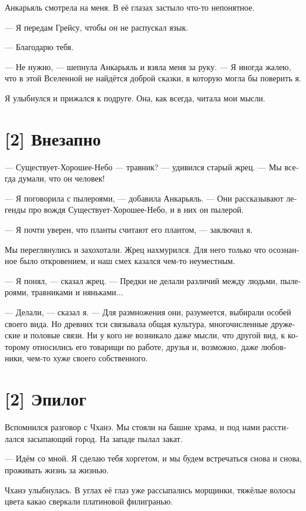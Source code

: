 \documentclass[a4paper,12pt,fleqn]{book}\usepackage{polyglossia}\setdefaultlanguage[babelshorthands=true]{russian}\setotherlanguage{english}\defaultfontfeatures{Ligatures=TeX,Mapping=tex-text}\usepackage{xcolor}\newcommand{\ml}[3]{#2}
\begin{document}
{Анкарьяль смотрела на меня.
В её глазах застыло что-то непонятное.

--- Я передам Грейсу, чтобы он не распускал язык.

--- Благодарю тебя.

--- Не нужно, --- шепнула Анкарьяль и взяла меня за руку.
--- Я иногда жалею, что в этой Вселенной не найдётся доброй сказки, в которую могла бы поверить я.

Я улыбнулся и прижался к подруге.
Она, как всегда, читала мои мысли.

\section{[2] Внезапно}

--- Существует-Хорошее-Небо — травник? --- удивился старый жрец.
--- Мы всегда думали, что он человек!

--- Я поговорила с пылероями, --- добавила Анкарьяль.
--- Они рассказывают легенды про вождя Существует-Хорошее-Небо, и в них он пылерой.

--- Я почти уверен, что планты считают его плантом, --- заключил я.

Мы переглянулись и захохотали.
Жрец нахмурился.
Для него только что осознанное было откровением, и наш смех казался чем-то неуместным.

--- Я понял, --- сказал жрец.
--- Предки не делали различий между людьми, пылероями, травниками и няньками...

--- Делали, --- сказал я.
--- Для размножения они, разумеется, выбирали особей своего вида.
Но древних тси связывала общая культура, многочисленные дружеские и половые связи.
Ни у кого не возникало даже мысли, что другой вид, к которому относились его товарищи по работе, друзья и, возможно, даже любовники, чем-то хуже своего собственного.

\section{[2] Эпилог}

Вспомнился разговор с Чханэ.
Мы стояли на башне храма, и под нами расстилался засыпающий город.
На западе пылал закат.

--- Идём со мной.
Я сделаю тебя хоргетом, и мы будем встречаться снова и снова, проживать жизнь за жизнью.

Чханэ улыбнулась.
В углах её глаз уже рассыпались морщинки, тяжёлые волосы цвета какао сверкали платиновой филигранью.

}
\end{document}
